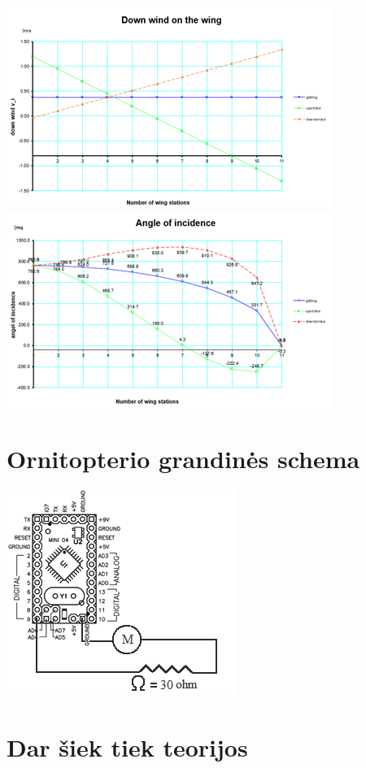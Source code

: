 \documentclass{VUMIFPSkursinis}
\begin{document}
\includegraphics[scale=0.9]{img/downwind}\\
\includegraphics[scale=0.9]{img/angle}\\

\section{Ornitopterio grandinės schema}
\includegraphics[scale=0.9]{img/scheme}\\

\section{Dar šiek tiek teorijos}
\end{document}
